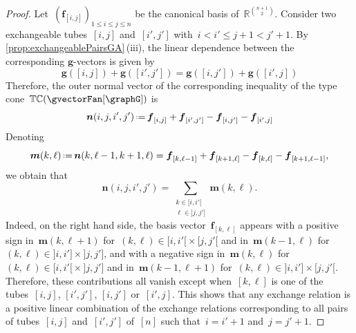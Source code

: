 \documentclass{amsart}
\theoremstyle{definition}
\newcommand{\R}{\mathbb{R}} %
\renewcommand{\b}[1]{{\boldsymbol{#1}}} %
\newcommand{\eqdef}{\mbox{\,\raisebox{0.2ex}{\scriptsize\ensuremath{\mathrm:}}\ensuremath{=}\,}} %
\newcommand{\gvector}[1]{\b{g}(#1)} %
\newcommand{\typeCone}{\mathbb{TC}} %
\begin{document}
\begin{proof}
Let~$(\b{f}_{[i,j]})_{1 \le i \le j \le n}$ be the canonical basis of~$\R^{\binom{n+1}{2}}$.
Consider two exchangeable tubes~$[i,j]$ and~$[i',j']$ with~${i < i' \le j+1 < j'+1}$.
By \cref{prop:exchangeablePairsGA}\,(iii), the linear dependence between the corresponding $\b{g}$-vectors is given by
\[
\gvector{[i,j]} + \gvector{[i',j']} = \gvector{[i,j']} + \gvector{[i',j]}
\]
Therefore, the outer normal vector of the corresponding inequality of the type cone~$\typeCone(\gvectorFan[\graphG])$ is
\[
\b{n}(i,j,i',j') \eqdef \b{f}_{[i,j]} + \b{f}_{[i',j']} - \b{f}_{[i,j']} - \b{f}_{[i',j]}
\]
Denoting
\[
\b{m}(k,\ell) \eqdef \b{n}(k,\ell-1,k+1,\ell) = \b{f}_{[k, \ell-1]} + \b{f}_{[k+1, \ell]} - \b{f}_{[k, \ell]} - \b{f}_{[k+1, \ell-1]},
\]
we obtain that
\[
\b{n}(i,j,i',j') = \sum_{\substack{k \in {[i,i'[} \\ \ell \in {]j,j']}}} \b{m}(k,\ell).
\]
Indeed, on the right hand side, the basis vector~$\b{f}_{[k,\ell]}$ appears with a positive sign in~$\b{m}(k,{\ell+1})$ for~$(k,\ell) \in {[i,i'[} \times {[j,j'[}$ and in~$\b{m}(k-1, \ell)$ for~$(k,\ell) \in {]i,i']} \times {]j,j']}$, and with a negative sign in~$\b{m}(k,\ell)$ for~$(k,\ell) \in {[i,i'[} \times {]j,j']}$ and in~$\b{m}(k-1,\ell+1)$ for~$(k,\ell) \in {]i,i']} \times {[j,j'[}$.
Therefore, these contributions all vanish except when~$[k, \ell]$ is one of the tubes~$[i,j]$, $[i',j']$, $[i,j']$ or~$[i',j]$.
This shows that any exchange relation is a positive linear combination of the exchange relations corresponding to all pairs of tubes~$[i,j]$ and~$[i',j']$ of~$[n]$ such that~$i = i'+1$ and~$j = j'+1$.


\end{proof}
\end{document}
